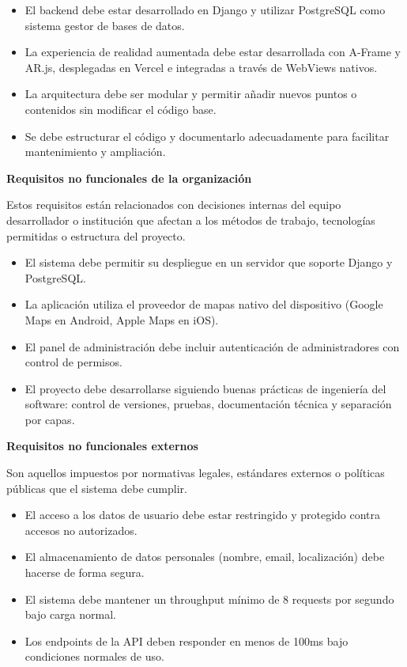 \begin{itemize}
    \item[RNF13:] El backend debe estar desarrollado en Django y utilizar PostgreSQL como sistema gestor de bases de datos.
    \item[RNF14:] La experiencia de realidad aumentada debe estar desarrollada con A-Frame y AR.js, desplegadas en Vercel e integradas a través de WebViews nativos.
    \item[RNF15:] La arquitectura debe ser modular y permitir añadir nuevos puntos o contenidos sin modificar el código base.
    \item[RNF16:] Se debe estructurar el código y documentarlo adecuadamente para facilitar mantenimiento y ampliación.
\end{itemize}

\textbf{Requisitos no funcionales de la organización}

Estos requisitos están relacionados con decisiones internas del equipo desarrollador o institución que afectan a los métodos de trabajo, tecnologías permitidas o estructura del proyecto.

\begin{itemize}
    \item[RNF17:] El sistema debe permitir su despliegue en un servidor que soporte Django y PostgreSQL.
    \item[RNF18:] La aplicación utiliza el proveedor de mapas nativo del dispositivo (Google Maps en Android, Apple Maps en iOS).
    \item[RNF19:] El panel de administración debe incluir autenticación de administradores con control de permisos.
    \item[RNF20:] El proyecto debe desarrollarse siguiendo buenas prácticas de ingeniería del software: control de versiones, pruebas, documentación técnica y separación por capas.
\end{itemize}

\textbf{Requisitos no funcionales externos}

Son aquellos impuestos por normativas legales, estándares externos o políticas públicas que el sistema debe cumplir.

\begin{itemize}
    \item[RNF21:] El acceso a los datos de usuario debe estar restringido y protegido contra accesos no autorizados.
    \item[RNF22:] El almacenamiento de datos personales (nombre, email, localización) debe hacerse de forma segura.
    \item[RNF23:] El sistema debe mantener un throughput mínimo de 8 requests por segundo bajo carga normal. 
    \item[RNF24:] Los endpoints de la API deben responder en menos de 100ms bajo condiciones normales de uso.
\end{itemize}

